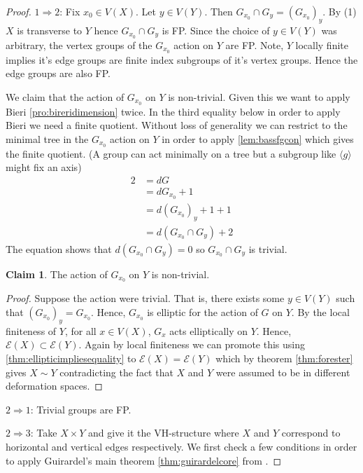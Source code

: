 \documentclass[12pt,parskip=full]{report}
\theoremstyle{plain}
\theoremstyle{definition}
\newtheorem*{claim*}{Claim}
\begin{document}
\begin{proof}

    $1\Rightarrow 2$: Fix $x_0 \in V(X)$. Let $y\in V(Y)$. Then $G_{x_0} \cap G_y = (G_{x_0})_y$. By (1) $X$ is transverse to $Y$ hence $G_{x_0}\cap G_y$ is FP. Since the choice of $y\in V(Y)$ was arbitrary, the vertex groups of the $G_{x_0}$ action on $Y$ are FP. Note, $Y$ locally finite implies it's edge groups are finite index subgroups of it's vertex groups. Hence the edge groups are also FP. 
    
    We claim that the action of $G_{x_0}$ on $Y$ is non-trivial. Given this we want to apply Bieri \ref{pro:bireridimension} twice. In the third equality below in order to apply Bieri we need a finite quotient. Without loss of generality we can restrict to the minimal tree in the \(G_{x_0}\) action on \(Y\) in order to apply \ref{lem:bassfgcon} which gives the finite quotient. (A group can act minimally on a tree but a subgroup like \(\langle g\rangle\) might fix an axis)
    \begin{align*}
        2 &= dG\\
          &= dG_{x_0}+1\\
          &= d( G_{x_0} )_y+1+1\\
          &= d(G_{x_0}\cap G_y)+2
    \end{align*}
    The equation shows that $d(G_{x_0}\cap G_y)=0$ so $G_{x_0}\cap G_y$ is trivial.
    
    \begin{claim*}
    The action of $G_{x_0}$ on $Y$ is non-trivial.
    \begin{proof}
        Suppose the action were trivial. That is, there exists some $y\in V(Y)$ such that $(G_{x_0})_y=G_{x_0}$. Hence, $G_{x_0}$ is elliptic for the action of $G$ on $Y$. By the local finiteness of $Y$, for all $x\in V(X)$, $G_x$ acts elliptically on $Y$. Hence, $\mathcal{E}(X)\subset \mathcal{E}(Y)$. Again by local finiteness we can promote this using \ref{thm:ellipticimpliesequality} to $\mathcal{E}(X) = \mathcal{E}(Y)$ which by theorem \ref{thm:forester} gives $X \sim Y$  contradicting the fact that $X$ and $Y$ were assumed to be in different deformation spaces.
    \end{proof}
    \end{claim*}
$2\Rightarrow 1$: Trivial groups are FP.

$2\Rightarrow 3$: Take $X \times Y$ and give it the VH-structure where $X$ and $Y$ correspond to horizontal and vertical edges respectively. We first check a few conditions in order to apply Guirardel's main theorem \ref{thm:guirardelcore} from \cite{guirardelcorepaper}. 
    

\end{proof}
\end{document}

